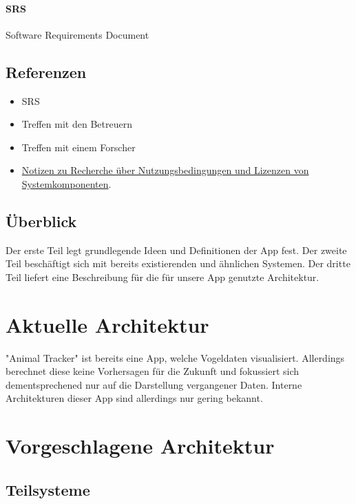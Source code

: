 \documentclass[12pt]{article} %
\begin{document}
	\paragraph{SRS} Software Requirements Document



\subsection{Referenzen}
\begin{itemize}
	\item SRS
	\item Treffen mit den Betreuern
	\item Treffen mit einem Forscher
	\item \href{https://git.uni-konstanz.de/kn/swp2018/group12/tree/master/Dokumentation/Lizenzen}{Notizen zu Recherche über Nutzungsbedingungen und Lizenzen von Systemkomponenten}.
\end{itemize}


\subsection{Überblick}

Der erste Teil legt grundlegende Ideen und Definitionen der App fest. Der zweite Teil beschäftigt sich mit bereits existierenden und ähnlichen Systemen. Der dritte Teil liefert eine Beschreibung für die für unsere App genutzte Architektur.  





\section{Aktuelle Architektur}

"Animal Tracker" ist bereits eine App, welche Vogeldaten visualisiert. Allerdings berechnet diese keine Vorhersagen für die Zukunft und fokussiert sich dementsprechened nur auf die Darstellung vergangener Daten. Interne Architekturen dieser App sind allerdings nur gering bekannt.


\section{Vorgeschlagene Architektur}



\subsection{Teilsysteme}
	{\color{red}{Timo}}
\end{document}
